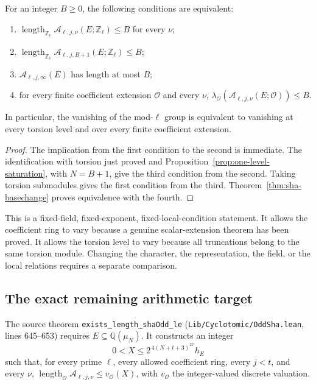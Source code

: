 \begin{samepage}
\begin{corollary}
\label{cor:sha-one-precision}
For an integer \(B\geq0\), the following conditions are equivalent:
\begin{enumerate}
\item \(\operatorname{length}_{\mathbb Z_\ell}
        \mathcal A_{\ell,j,\nu}(E;\mathbb Z_\ell)\leq B\)
      for every \(\nu\);
\item \(\operatorname{length}_{\mathbb Z_\ell}
        \mathcal A_{\ell,j,B+1}(E;\mathbb Z_\ell)\leq B\);
\item \(\mathcal A_{\ell,j,\infty}(E)\) has length at most \(B\);
\item for every finite coefficient extension \(\mathcal O\) and every
      \(\nu\),
      \(\lambda_{\mathcal O}
          (\mathcal A_{\ell,j,\nu}(E;\mathcal O))\leq B\).
\end{enumerate}
In particular, the vanishing of the mod-\(\ell\) group is equivalent
to vanishing at every torsion level and over every finite coefficient
extension.
\end{corollary}
\end{samepage}

\begin{proof}
The implication from the first condition to the second is immediate.
The identification with torsion just proved and
Proposition~\ref{prop:one-level-saturation}, with \(N=B+1\), give the
third condition from the second. Taking torsion submodules gives the
first condition from the third.
Theorem~\ref{thm:sha-basechange} proves equivalence with the fourth.
\end{proof}

This is a fixed-field, fixed-exponent, fixed-local-condition
statement. It allows the coefficient ring to vary because a genuine
scalar-extension theorem has been proved. It allows the torsion level
to vary because all truncations belong to the same torsion module.
Changing the character, the representation, the field, or the local
relations requires a separate comparison.

\subsection{The exact remaining arithmetic target}

The source theorem \texttt{exists\_length\_shaOdd\_le}
(\texttt{Lib/Cyclotomic/OddSha.lean}, lines 645--653) requires
\(E\subseteq\mathbb Q(\mu_N)\). It constructs an integer
\[
  0<X\leq 2^{\,4(N+t+3)^{27}}h_E
\]
such that, for every prime \(\ell\), every allowed coefficient ring,
every \(j<t\), and every \(\nu\),
\(\operatorname{length}_{\mathcal O}\mathcal A_{\ell,j,\nu}
  \leq v_{\mathcal O}(X)\), with \(v_{\mathcal O}\) the
integer-valued discrete valuation.

